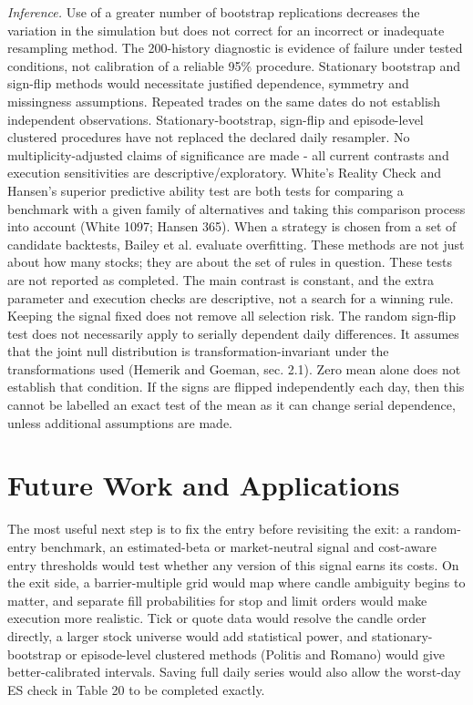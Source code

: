 \documentclass[11pt,a4paper]{article}
\begin{document}
\textit{Inference.} Use of a greater number of bootstrap replications decreases the variation in the simulation but does not correct for an incorrect or inadequate resampling method. The 200-history diagnostic is evidence of failure under tested conditions, not calibration of a reliable 95\% procedure. Stationary bootstrap and sign-flip methods would necessitate justified dependence, symmetry and missingness assumptions. Repeated trades on the same dates do not establish independent observations. Stationary-bootstrap, sign-flip and episode-level clustered procedures have not replaced the declared daily resampler. No multiplicity-adjusted claims of significance are made - all current contrasts and execution sensitivities are descriptive/exploratory. White's Reality Check and Hansen's superior predictive ability test are both tests for comparing a benchmark with a given family of alternatives and taking this comparison process into account (White 1097; Hansen 365). When a strategy is chosen from a set of candidate backtests, Bailey et al. evaluate overfitting. These methods are not just about how many stocks; they are about the set of rules in question. These tests are not reported as completed. The main contrast is constant, and the extra parameter and execution checks are descriptive, not a search for a winning rule. Keeping the signal fixed does not remove all selection risk. The random sign-flip test does not necessarily apply to serially dependent daily differences. It assumes that the joint null distribution is transformation-invariant under the transformations used (Hemerik and Goeman, sec. 2.1). Zero mean alone does not establish that condition. If the signs are flipped independently each day, then this cannot be labelled an exact test of the mean as it can change serial dependence, unless additional assumptions are made.


\section*{Future Work and Applications}

The most useful next step is to fix the entry before revisiting the exit: a random-entry benchmark, an estimated-beta or market-neutral signal and cost-aware entry thresholds would test whether any version of this signal earns its costs. On the exit side, a barrier-multiple grid would map where candle ambiguity begins to matter, and separate fill probabilities for stop and limit orders would make execution more realistic. Tick or quote data would resolve the candle order directly, a larger stock universe would add statistical power, and stationary-bootstrap or episode-level clustered methods (Politis and Romano) would give better-calibrated intervals. Saving full daily series would also allow the worst-day ES check in Table 20 to be completed exactly.
\end{document}
